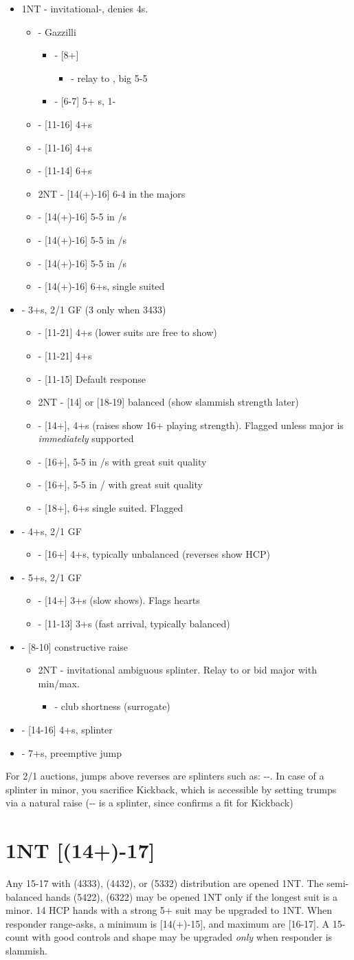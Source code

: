 \documentclass[12pt]{report}
\newcommand{\ul}[1]{\begin{itemize}#1\end{itemize}}
\newcommand{\li}{\item[~]}
\newcommand{\bidsection}[2]{\section{\texorpdfstring{#1}{#2}}}
\begin{document}
    \ul {
        \li 1NT - invitational-, denies 4\sp{}s.
        \ul {
            \li \cl2 - Gazzilli
            \ul {
                \li \di2 - [8+]
                \ul {
                    \li \he2 - relay to \sp2, big 5-5
                }
                \li \he2 - [6-7] 5+ \he{}s, 1-\sp{}
            }
            \li \di2 - [11-16] 4+\di{}s
            \li \he2 - [11-16] 4+\he{}s
            \li \sp2 - [11-14] 6+\sp{}s
            \li 2NT - [14(+)-16] 6-4 in the majors
            \li \cl3 - [14(+)-16] 5-5 in \cl{}/\sp{}s
            \li \di3 - [14(+)-16] 5-5 in \di{}/\sp{}s
            \li \he3 - [14(+)-16] 5-5 in \he{}/\sp{}s
            \li \sp3 - [14(+)-16] 6+\sp{}s, single suited
        }
        \li \cl2 - 3+\cl{}s, 2/1 GF (3 only when 3433)
        \ul {
            \li \di2 - [11-21] 4+\di{}s (lower suits are free to show)
            \li \he2 - [11-21] 4+\he{}s
            \li \sp2 - [11-15] Default response
            \li 2NT - [14] or [18-19] balanced (show slammish strength later)
            \li \cl3 - [14+], 4+\cl{}s (raises show 16+ playing strength).  Flagged unless major is \textit{immediately} supported
            \li \di3 - [16+], 5-5 in \di{}/\sp{}s with great suit quality
            \li \he3 - [16+], 5-5 in \he{}/\sp{} with great suit quality
            \li \sp3 - [18+], 6+\sp{}s single suited.  Flagged
        }
        \li \di2 - 4+\di{}s, 2/1 GF
        \ul {
            \li \cl3 - [16+] 4+\cl{}s, typically unbalanced (reverses show HCP)
        }
        \li \he2 - 5+\he{}s, 2/1 GF
        \ul {
            \li \he3 - [14+] 3+\he{}s (slow shows).  Flags hearts
            \li \he4 - [11-13] 3+\he{}s (fast arrival, typically balanced)
        }
        \li \sp2 - [8-10] constructive raise
        \ul {
            \li 2NT - invitational ambiguous splinter.  Relay to \cl3 or bid major with min/max.
            \ul {
                \li \cl3- club shortness (surrogate)
            }
        }
        \li \he3 - [14-16] 4+\sp{}s, splinter
        \li \he4 - 7+\he{}s, preemptive jump
    }

    For 2/1 auctions, jumps above reverses are splinters such as: --.  In case of a splinter in minor, you sacrifice Kickback, which is accessible by setting trumps via a natural raise (-- is a splinter, since  confirms a fit for Kickback)

\bidsection{1NT [(14+)-17]}{1NT [(14+)-17]} \label{2:6}

    Any 15-17 with (4333), (4432), or (5332) distribution are opened 1NT.  The semi-balanced hands (5422), (6322) may be opened 1NT only if the longest suit is a minor. 14 HCP hands with a strong 5+ suit may be upgraded to 1NT.  When responder range-asks, a minimum is [14(+)-15], and maximum are [16-17].  A 15-count with good controls and shape may be upgraded \textit{only} when responder is slammish.
    \\
\end{document}
